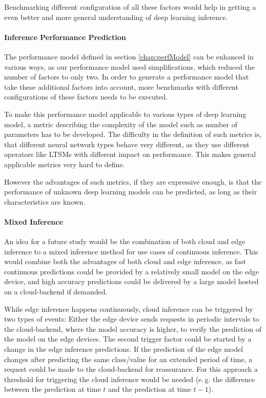Benchmarking different configuration of all these factors would help in getting a even better and more general understanding of deep learning inference.

\paragraph{Inference Performance Prediction}
The performance model defined in section \ref{chap:perfModel} can be enhanced in various ways, as our performance model used simplifications, which reduced the number of factors to only two.
In order to generate a performance model that take these additional factors into account, more benchmarks with different configurations of these factors needs to be executed.

To make this performance model applicable to various types of deep learning model, a metric describing the complexity of the model such as number of parameters has to be developed.
The difficulty in the definition of such metrics is, that different neural network types behave very different, as they use different operators like LTSMs with different impact on performance. 
This makes general applicable metrics very hard to define.

However the advantages of such metrics, if they are expressive enough, is that the performance of unknown deep learning models can be predicted, as long as their characteristics are known.
\paragraph{Mixed Inference}
An idea for a future study would be the combination of both cloud and edge inference to a mixed inference method for use cases of continuous inference.
This would combine both the advantages of both cloud and edge inference, as fast continuous predictions could be provided by a relatively small model on the edge device, and high accuracy predictions could be delivered by a large model hosted on a cloud-backend if demanded. 

While edge inference happens continuously, cloud inference can be triggered by two types of events:
Either the edge device sends requests in periodic intervals to the cloud-backend, where the model accuracy is higher, to verify the prediction of the model on the edge devices.
The second trigger factor could be started by a change in the edge inference predictions. If the prediction of the edge model changes after predicting the same class/value for an extended period of time, a request could be made to the cloud-backend for reassurance. For this approach a threshold for triggering the cloud inference would be needed (e.\,g. the difference between the prediction at time $t$ and the prediction at time $t-1$).



